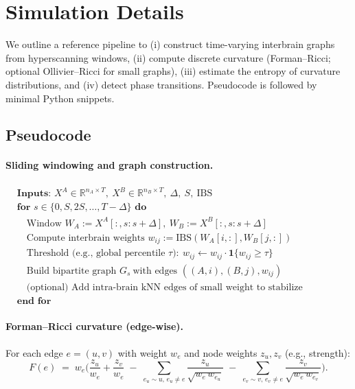 \documentclass{article}
\theoremstyle{definition}
\begin{document}
\section{Simulation Details}
\label{sec:sim-details}

We outline a reference pipeline to (i) construct time-varying interbrain graphs
from hyperscanning windows, (ii) compute discrete curvature (Forman--Ricci; optional
Ollivier--Ricci for small graphs), (iii) estimate the entropy of curvature distributions,
and (iv) detect phase transitions. Pseudocode is followed by minimal Python snippets.

\subsection{Pseudocode}

\paragraph{Sliding windowing and graph construction.}
\begin{align*}
&\textbf{Inputs: } X^A \in \mathbb{R}^{n_A \times T},\ X^B \in \mathbb{R}^{n_B \times T},\ \Delta,\ S,\ \mathrm{IBS} \\
&\textbf{for } s \in \{0, S, 2S, \dots, T-\Delta\} \textbf{ do}\\
&\quad \text{Window } W_A := X^A[:, s{:}s{+}\Delta],\ W_B := X^B[:, s{:}s{+}\Delta]\\
&\quad \text{Compute interbrain weights } w_{ij} := \mathrm{IBS}(W_A[i,:], W_B[j,:])\\
&\quad \text{Threshold (e.g., global percentile } \tau):\ w_{ij} \leftarrow w_{ij}\cdot\mathbf{1}\{w_{ij}\ge \tau\}\\
&\quad \text{Build bipartite graph } G_s\ \text{with edges } ((A,i),(B,j), w_{ij})\\
&\quad \text{(optional) Add intra-brain kNN edges of small weight to stabilize neighborhoods}\\
&\textbf{end for}
\end{align*}

\paragraph{Forman--Ricci curvature (edge-wise).}
For each edge $e=(u,v)$ with weight $w_e$ and node weights $z_u,z_v$ (e.g., strength):
\[
F(e) \;=\; w_e \Bigg(
\frac{z_u}{w_e} + \frac{z_v}{w_e}
\;-\; \sum_{e_u\sim u,\,e_u\neq e}\frac{z_u}{\sqrt{w_e\,w_{e_u}}}
\;-\; \sum_{e_v\sim v,\,e_v\neq e}\frac{z_v}{\sqrt{w_e\,w_{e_v}}}
\Bigg).
\]
\end{document}
